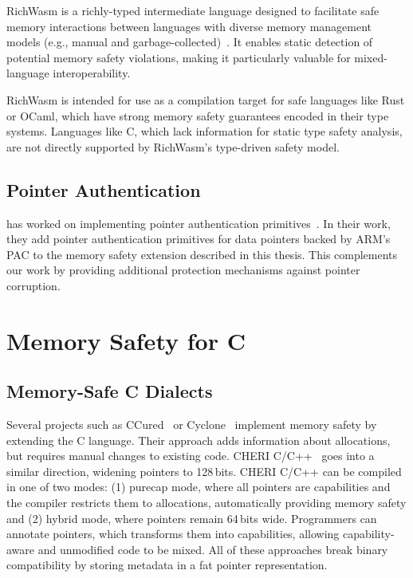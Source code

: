 RichWasm is a richly-typed intermediate language designed to facilitate safe memory interactions between languages with diverse memory management models (e.g., manual and garbage-collected)~\cite{paraskevopoulou2024richwasm}.
It enables static detection of potential memory safety violations, making it particularly valuable for mixed-language interoperability.

RichWasm is intended for use as a compilation target for safe languages like Rust or OCaml, which have strong memory safety guarantees encoded in their type systems.
Languages like C, which lack information for static type safety analysis, are not directly supported by RichWasm's type-driven safety model.

\subsection{Pointer Authentication}
\label{subsec:related-pointer-authentication}

\citeauthor*{rehde2023wasm} has worked on implementing pointer authentication primitives~\cite{rehde2023wasm}.
In their work, they add pointer authentication primitives for data pointers backed by ARM's \ac{PAC} to the memory safety extension described in this thesis.
This complements our work by providing additional protection mechanisms against pointer corruption.

\section{Memory Safety for C}
\label{sec:related-memory-safety}

\subsection{Memory-Safe C Dialects}
\label{subsec:extensions-to-the-c-language}

Several projects such as CCured~\cite{necula2002ccured} or Cyclone~\cite{jim2002cyclone} implement memory safety by extending the C language.
Their approach adds information about allocations, but requires manual changes to existing code.
CHERI C/C++~\cite{watson_cheri_2020} goes into a similar direction, widening pointers to 128\,bits.
CHERI C/C++ can be compiled in one of two modes: (1) purecap mode, where all pointers are capabilities and the compiler restricts them to allocations, automatically providing memory safety and (2) hybrid mode, where pointers remain 64\,bits wide.
Programmers can annotate pointers, which transforms them into capabilities, allowing capability-aware and unmodified code to be mixed.
All of these approaches break binary compatibility by storing metadata in a fat pointer representation.

